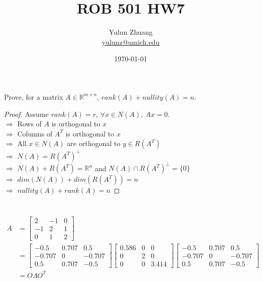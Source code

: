 \documentclass{article}
\title{ROB 501 HW7}
\author{Yulun Zhuang \\ \href{mailto:yulunz@umich.edu}{yulunz@umich.edu}}
\date{\today}
\theoremstyle{definition} %
\newcommand{\RR}{\mathbb{R}}
\begin{document}
\maketitle

\section{}
Prove, for a matrix $A\in \RR ^{m\times n}$, $rank(A) + nullity(A) = n$.

\begin{proof}
    Assume $rank(A) = r$, $\forall x\in N(A),\ Ax=0$.\\
    $\Rightarrow$ Rows of $A$ is orthogonal to $x$\\
    $\Rightarrow$ Columns of $A^T$ is orthogonal to $x$\\
    $\Rightarrow$ All $x\in N(A)$ are orthogonal to $y\in R(A^T)$\\
    $\Rightarrow$ $N(A) = R(A^T)^\perp $\\
    $\Rightarrow$ $N(A) + R(A^T) = \RR^n$ and $N(A) \cap R(A^T)^\perp = \{0\}$\\
    $\Rightarrow$ $dim(N(A)) + dim(R(A^T)) = n$\\
    $\Rightarrow$ $nullity(A) + rank(A) = n$
\end{proof}



\section{}

\begin{align*}
	A &= 
	\begin{bmatrix}
		2 & -1 & 0\\
		-1 & 2 & 1\\
		0 & 1 & 2
	\end{bmatrix}
	\\
	&=
	\begin{bmatrix}
		-0.5 & 0.707 & 0.5\\
		-0.707 & 0 & -0.707\\
		0.5 & 0.707 & -0.5
	\end{bmatrix}
	\begin{bmatrix}
		0.586 & 0 & 0\\
		0 & 2 & 0\\
		0 & 0 & 3.414
	\end{bmatrix}
	\begin{bmatrix}
		-0.5 & 0.707 & 0.5\\
		-0.707 & 0 & -0.707\\
		0.5 & 0.707 & -0.5
	\end{bmatrix}
	\\
	&=O \Lambda O^T
\end{align*}
\end{document}
